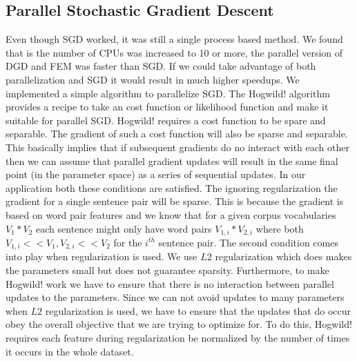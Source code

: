 \documentclass[11pt,letterpaper]{article}
\begin{document}
\subsection*{Parallel Stochastic Gradient Descent}
Even though SGD worked, it was still a single process based method. We found that is the number of CPUs was increased to 10 or more, the parallel version of DGD and FEM was faster than SGD. If we could take advantage of both parallelization and SGD it would result in much higher speedups. We implemented a simple algorithm to parallelize SGD. The Hogwild! algorithm \cite{recht2011hogwild} provides a  recipe to take an cost function or likelihood function and make it suitable for parallel SGD. Hogwild! requires a cost function to be spare and separable. The gradient of such a cost function will also be sparse and separable. This basically implies that if subsequent gradients do no interact with each other then we can assume that parallel gradient updates will result in the same final point (in the parameter space) as a series of sequential updates. In our application both these conditions are satisfied. 
The ignoring regularization the gradient for a single sentence pair will be sparse. %
 This is because the gradient is based on word pair features and we know that for a given corpus vocabularies $V_1 *V_2$ each sentence might only have word pairs $V_{1,i} * V_{2,i}$ where both $V_{1,i} << V_1, V_{2,i} << V_2$ for the $i^{th}$ sentence pair. The second condition comes into play when regularization is used. We use $L2$ regularization which does makes the parameters small but does not guarantee sparsity. Furthermore, to make Hogwild! work we have to ensure that there is no interaction between parallel updates to the parameters. Since we can not avoid updates to many parameters when $L2$ regularization is used, we have to ensure that the updates that do occur obey the overall objective that we are trying to optimize for. To do this, Hogwild! requires each feature during regularization be normalized by the number of times it occurs in the whole dataset.
\end{document}
